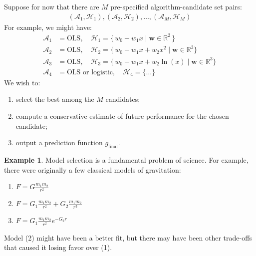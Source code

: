 \documentclass[12pt, a4paper]{article}
\theoremstyle{definition}
\newtheorem*{example}{Example}
\begin{document}
	Suppose for now that there are $M$ pre-specified algorithm-candidate set pairs:
	\begin{align*}
		(\mathcal{A}_1, \mathcal{H}_1), (\mathcal{A}_2,\mathcal{H}_2),\ldots,
		(\mathcal{A}_M, \mathcal{H}_M)
	\end{align*}
	For example, we might have:
	\begin{align*}
		\mathcal{A}_1 &= \text{OLS},\quad \mathcal{H}_1 = \{\, w_0+w_1x \mid \bm{w}\in\mathbb{R}^2 \,\}\\
		\mathcal{A}_2 &= \text{OLS},\quad \mathcal{H}_2 = \{\, w_0+w_1x+w_2x^2\mid \bm{w}\in\mathbb{R}^3\}\\
		\mathcal{A}_3 &= \text{OLS},\quad \mathcal{H}_3 = \{\, w_0+w_1x+w_2\ln(x) \mid \bm{w}\in\mathbb{R}^3\}\\
		\mathcal{A}_4 &= \text{OLS or logistic},\quad \mathcal{H}_4 = \{\ldots\}
	\end{align*}
	We wish to:
	\begin{enumerate}[label=(\roman*)]
		\item select the best among the $M$ candidates;
		\item compute a conservative estimate of future performance for the chosen candidate;
		\item output a prediction function $g_{\text{final}}$.
	\end{enumerate}
	\begin{tcolorbox}[breakable]
		\begin{example}
			Model selection is a fundamental problem of science. For example,
			there were originally a few classical models of gravitation:
			\begin{enumerate}[label=(\arabic*)]
				\item $F = G\frac{m_1m_2}{r^2}$
				\item $F = G_1\frac{m_1m_2}{r^2} + G_2\frac{m_1m_2}{r^3}$
				\item $F = G_1\frac{m_1m_2}{r^2}e^{-G_2r}$
			\end{enumerate}
			Model (2) might have been a better fit, but there may have been
			other trade-offs that caused it losing favor over (1).
		\end{example}
	\end{tcolorbox}
\end{document}
